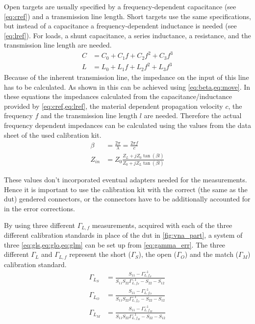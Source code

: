 \documentclass[12pt,a4paper,parskip=full,abstract=true,BCOR=12mm,twoside,open=right]{scrreprt}
\begin{document}
Open targets are usually specified by a frequency-dependent capacitance (see
\cref{eq:cref}) and a transmission line length. Short targets use the same
specifications, but instead of a capacitance a frequency-dependent inductance is
needed (see \cref{eq:lref}). For loads, a shunt capacitance, a series inductance,
a resistance, and the transmission line length are needed.
\begin{align}
    \label{eq:cref} C & = C_0 + C_1 f + C_2 f^2 + C_3 f^3 \\
    \label{eq:lref} L & = L_0 + L_1 f + L_2 f^2 + L_3 f^3
\end{align}
Because of the inherent transmission line, the impedance on the input of this
line has to be calculated. As shown in \cite{pozar_mw_engineering_2011} this
can be achieved using \cref{eq:beta,eq:move}. In these equations the impedances
calculated from the capacitance/inductance provided by \cref{eq:cref,eq:lref},
the material dependent propagation velocity $c$, the frequency $f$ and the transmission line
length $l$ are needed. Therefore the actual frequency dependent impedances can
be calculated using the values from the data sheet of the used calibration kit.
\begin{align}
    \label{eq:beta} \beta & = \frac{2 \pi}{\lambda} = \frac{2 \pi f}{c}\\
    \label{eq:move} Z_{in} & = Z_0 \frac{Z_L + j Z_0 \tan(\beta l)}{Z_0 + j Z_L \tan(\beta l)}
\end{align}

These values don't incorporated eventual adapters needed for the measurements.
Hence it is important to use the calibration kit with the correct (the same as the \gls{dut}) gendered connectors, or
the connectors have to be additionally accounted for in the error corrections.

By using three different $\Gamma_{L,f}$ measurements, acquired with each of the three different calibration standards in place of the \gls{dut} in \cref{fig:vna_part},
a system of three \cref{eq:gls,eq:glo,eq:glm} can be set up from \cref{eq:gamma_err}. The
three different $\Gamma_L$ and $\Gamma_{L,f}$ represent the short ($\Gamma_S$),
the open ($\Gamma_O$) and the match ($\Gamma_M$) calibration standard.
\begin{align}
    \label{eq:gls} \Gamma_{L_S} & = \frac{S_{11} - \Gamma_{L,f_S}^{-1}}{S_{11} S_{22}\Gamma_{L,f_S}^{-1} - S_{22} - S_{12}} \\
    \label{eq:glo} \Gamma_{L_O} & = \frac{S_{11} - \Gamma_{L,f_O}^{-1}}{S_{11} S_{22}\Gamma_{L,f_O}^{-1} - S_{22} - S_{12}} \\
    \label{eq:glm} \Gamma_{L_M} & = \frac{S_{11} - \Gamma_{L,f_M}^{-1}}{S_{11} S_{22}\Gamma_{L,f_M}^{-1} - S_{22} - S_{12}}
\end{align}
\end{document}
